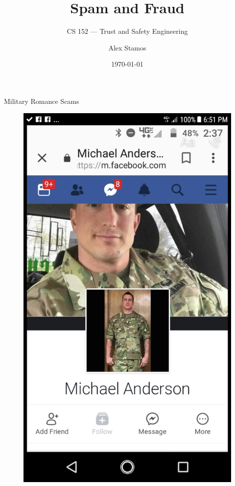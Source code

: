\documentclass[nobackground,dvipsnames,table]{beamer}
\title{Spam and Fraud}
\subtitle{CS 152 --- Trust and Safety Engineering}
\author[A. Stamos]{Alex Stamos}
\institute[Stanford University]{Stanford Cyber Policy Center}
\date[2022]{\today}
\begin{document}
\begin{frame}
    \titlepage
\end{frame}

\begin{frame}{Military Romance Scams}
    \begin{figure}
        \centering
        \includegraphics[height=0.85\textheight]{military-romance-scam}
    \end{figure}
\end{frame}
\end{document}
